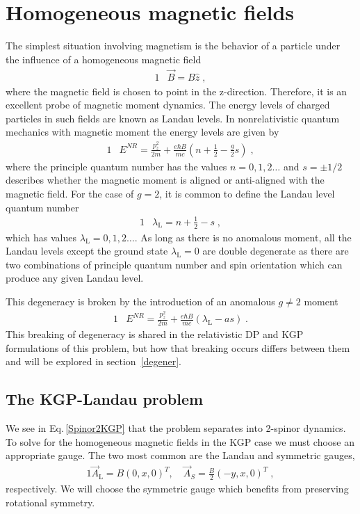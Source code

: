 \documentclass[epj]{svjour}
\begin{document}
\section{Homogeneous magnetic fields} \label{lan}
The simplest situation involving magnetism is the behavior of a particle under the influence of a homogeneous magnetic field
\begin{alignat}{1}
\label{lan01} &\vec{B}=B\hat{z}\;,\end{alignat}
where the magnetic field is chosen to point in the z-direction. Therefore, it is an excellent probe of magnetic moment dynamics. The energy levels of charged particles in such fields are known as Landau levels. In nonrelativistic quantum mechanics with magnetic moment the energy levels are given by
\begin{alignat}{1}
\label{lan02} &E^{NR}=\frac{p_{z}^{2}}{2m}+\frac{e\hbar B}{mc}\left(n+\frac{1}{2}-\frac{g}{2}s\right)\;,\end{alignat}
where the principle quantum number has the values $n=0,1,2\ldots$ and $s=\pm1/2$ describes whether the magnetic moment is aligned or anti-aligned with the magnetic field. For the case of $g=2$, it is common to define the Landau level quantum number
\begin{alignat}{1}
\label{lan03} &\lambda_\mathrm{L}=n+\frac{1}{2}-s\;,\end{alignat}
which has values $\lambda_\mathrm{L}=0,1,2\ldots$. As long as there is no anomalous moment, all the Landau levels except the ground state $\lambda_\mathrm{L}=0$ are double degenerate as there are two combinations of principle quantum number and spin orientation which can produce any given Landau level. 

This degeneracy is broken by the introduction of an anomalous $g\neq2$ moment
\begin{alignat}{1}
\label{lan04} &E^{NR}=\frac{p_{z}^{2}}{2m}+\frac{e\hbar B}{mc}\left(\lambda_\mathrm{L}-as\right)\;.
\end{alignat}
This breaking of degeneracy is shared in the relativistic DP and KGP formulations of this problem, but how that breaking occurs differs between them and will be explored in section~\ref{degener}.

\subsection{The KGP-Landau problem} \label{lankpg}
We see in Eq.\,\eqref{Spinor2KGP} that the problem separates into 2-spinor dynamics.
To solve for the homogeneous magnetic fields in the KGP case we must choose an appropriate gauge. The two most common are the Landau and symmetric gauges,
\begin{alignat}{1}
\label{lan05} \vec{A}_\mathrm{L}=B\left(0,x,0\right)^{T}, \quad \vec{A}_{S}=\frac{B}{2}\left(-y,x,0\right)^{T}\;,
\end{alignat}
respectively. We will choose the symmetric gauge which benefits from preserving rotational symmetry. 
\end{document}
